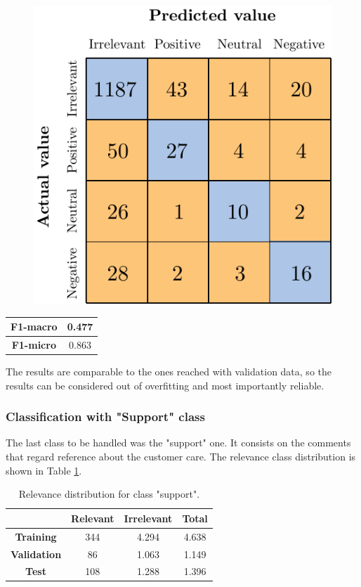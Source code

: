\begin{figure}[H]
	\centering
	\includegraphics[scale=1]{figures/conf_matrices/ita_exteriors/ita_cascade_exteriors_bpef_tst.pdf}
	\label{fig:ita_cascade_exteriors_bpef_tst}
\end{figure}

\begin{center}
	\begin{tabular}{ | c | c | } 
		\hline
		\textbf{F1-macro} & 0.477 \\
		\hline
		\textbf{F1-micro} & 0.863 \\ 
		\hline
	\end{tabular}
\end{center}

The results are comparable to the ones reached with validation data, so the results can be considered out of overfitting and most importantly reliable.

\subsubsection{Classification with "Support" class}

The last class to be handled was the "support" one. It consists on the comments that regard reference about the customer care. The relevance class distribution is shown in Table \ref{table:rel-dist-support}. 

\begin{table}[H]
	\centering
	\begin{tabular}{ | c  c  c | c | } 
		\hline
		& \textbf{Relevant} & \textbf{Irrelevant} & \textbf{Total} \\
		\hline
		\textbf{Training} & 344 & 4.294 & 4.638 \\ 
		\hline
		\textbf{Validation} & 86 & 1.063 & 1.149 \\ 
		\hline
		\textbf{Test} & 108 & 1.288 & 1.396 \\
		\hline
	\end{tabular}
	\caption{Relevance distribution for class "support".}
	\label{table:rel-dist-support}
\end{table}

